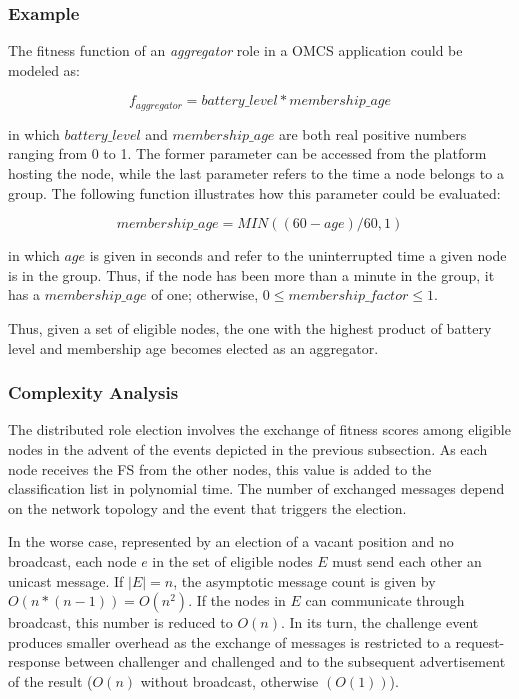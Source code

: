 \subsubsection{\textbf{Example}}

The fitness function of an \textit{aggregator} role in a OMCS application could be modeled as: 

$$
f_{aggregator} = battery\_level * membership\_age
$$

\noindent
in which $battery\_level$ and $membership\_age$ are both real positive numbers ranging from 0 to 1. The former parameter can be accessed from the platform hosting the node, while the last parameter refers to the time a node belongs to a group. The following function illustrates how this parameter could be evaluated:

$$
membership\_age = MIN((60 - age)/60, 1)
$$

\noindent
in which $age$ is given in seconds and refer to the uninterrupted time a given node is in the group. Thus, if the node has been more than a minute in the group, it has a $membership\_age$ of one; otherwise, $0 \le membership\_factor \le 1$.

Thus, given a set of eligible nodes, the one with the highest product of battery level and membership age becomes elected as an aggregator. 

\subsubsection{\textbf{Complexity Analysis}}


The distributed role election involves the exchange of fitness scores among eligible nodes in the advent of the events depicted in the previous subsection. As each node receives the FS from the other nodes, this value is added to the classification list in polynomial time. The number of exchanged messages depend on the network topology and the event that triggers the election. 

In the worse case, represented by an election of a vacant position and no broadcast, each node $e$ in the set of eligible nodes $E$ must send each other an unicast message. If $|E| = n$, the asymptotic message count is given by $O(n * (n-1)) = O(n^2)$. If the nodes in $E$ can communicate through broadcast, this number is reduced to $O(n)$. In its turn, the challenge event produces smaller overhead as the exchange of messages is restricted to a request-response between challenger and challenged and to the subsequent advertisement of the result ($O(n)$ without broadcast, otherwise $(O(1))$).

